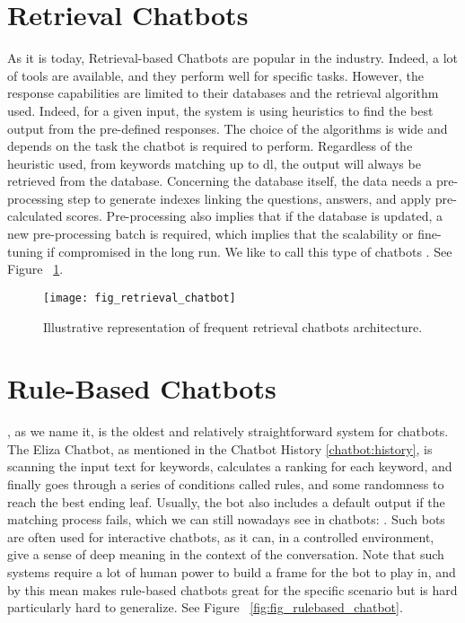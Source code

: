 \section{Retrieval Chatbots}
\label{chatbot:retrieval}
As it is today, Retrieval-based Chatbots are popular in the industry. Indeed, a lot of tools are available, and they perform well for specific tasks. However, the response capabilities are limited to their databases and the retrieval algorithm used. Indeed, for a given input, the system is using heuristics to find the best output from the pre-defined responses. The choice of the algorithms is wide and depends on the task the chatbot is required to perform. Regardless of the heuristic used, from keywords matching up to \gls{dl}, the output will always be retrieved from the database. Concerning the database itself, the data needs a pre-processing step to generate indexes linking the questions, answers, and apply pre-calculated scores. Pre-processing also implies that if the database is updated, a new pre-processing batch is required, which implies that the scalability or fine-tuning if compromised in the long run. We like to call this type of chatbots . See Figure ~\ref{fig:fig_retrieval_chatbot}.

\begin{figure}[H]
    \centering
    \texttt{[image: fig\_retrieval\_chatbot]}
    \caption{Illustrative representation of frequent retrieval chatbots architecture.}
    \label{fig:fig_retrieval_chatbot}
\end{figure}


\section{Rule-Based Chatbots}
\label{chatbot:rulebased}
, as we name it, is the oldest and relatively straightforward system for chatbots. The Eliza\cite{website:eliza} Chatbot, as mentioned in the Chatbot History \ref{chatbot:history}, is scanning the input text for keywords, calculates a ranking for each keyword, and finally goes through a series of conditions called rules, and some randomness to reach the best ending leaf. Usually, the bot also includes a default output if the matching process fails, which we can still nowadays see in chatbots: . Such bots are often used for interactive chatbots, as it can, in a controlled environment, give a sense of deep meaning in the context of the conversation. Note that such systems require a lot of human power to build a frame for the bot to play in, and by this mean makes rule-based chatbots great for the specific scenario but is hard particularly hard to generalize. See Figure ~\ref{fig:fig_rulebased_chatbot}.

